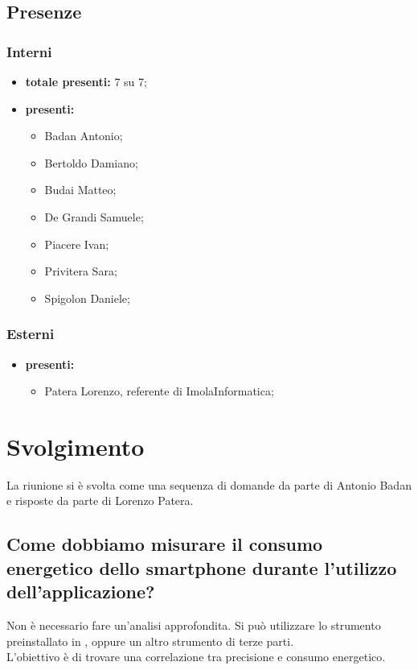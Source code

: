 \subsection*{Presenze}
\subsubsection*{Interni}
\begin{itemize}
	\item \textbf{totale presenti:} 7 su 7;
	\item \textbf{presenti: }
	\begin{itemize}
		\item Badan Antonio;
		\item Bertoldo Damiano;
		\item Budai Matteo;
		\item De Grandi Samuele;
		\item Piacere Ivan;
		\item Privitera Sara;
		\item Spigolon Daniele;
	\end{itemize}
\end{itemize}
\subsubsection*{Esterni}
	\begin{itemize}
		\item \textbf{presenti: }
		\begin{itemize}
			\item Patera Lorenzo, referente di ImolaInformatica;
		\end{itemize}
	\end{itemize}

\newpage
\section*{Svolgimento}
La riunione si è svolta come una sequenza di domande da parte di Antonio Badan e risposte da parte di Lorenzo Patera.

\subsection*{Come dobbiamo misurare il consumo energetico dello smartphone durante l'utilizzo dell'applicazione?}
Non è necessario fare un'analisi approfondita. Si può utilizzare lo strumento preinstallato in , oppure un altro strumento di terze parti.\\
L'obiettivo è di trovare una correlazione tra precisione e consumo energetico.

